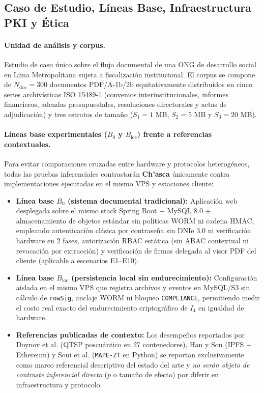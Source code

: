 \documentclass[runningheads,twocolumn]{llncs}
\begin{document}
\subsection{Caso de Estudio, Líneas Base, Infraestructura PKI y Ética}
\paragraph{Unidad de análisis y corpus.} Estudio de caso único sobre el flujo documental de una ONG de desarrollo social en Lima Metropolitana sujeta a fiscalización institucional. El corpus se compone de $N_{\text{doc}} = 300$ documentos PDF/A-1b/2b equitativamente distribuidos en cinco series archivísticas ISO 15489-1 (convenios interinstitucionales, informes financieros, adendas presupuestales, resoluciones directorales y actas de adjudicación) y tres estratos de tamaño ($S_1 = 1$ MB, $S_2 = 5$ MB y $S_3 = 20$ MB).

\paragraph{Líneas base experimentales ($B_0$ y $B_{\text{loc}}$) frente a referencias contextuales.} Para evitar comparaciones cruzadas entre hardware y protocolos heterogéneos, todas las pruebas inferenciales contrastarán \textbf{Ch'asca} únicamente contra implementaciones ejecutadas en el mismo VPS y estaciones cliente:
\begin{itemize}
    \item \textbf{Línea base $B_0$ (sistema documental tradicional):} Aplicación web desplegada sobre el mismo stack Spring Boot + MySQL 8.0 + almacenamiento de objetos estándar sin políticas WORM ni cadena HMAC, empleando autenticación clásica por contraseña sin DNIe 3.0 ni verificación hardware en 2 fases, autorización RBAC estática (sin ABAC contextual ni revocación por extracción) y verificación de firmas delegada al visor PDF del cliente (aplicable a escenarios E1--E10).
    \item \textbf{Línea base $B_{\text{loc}}$ (persistencia local sin endurecimiento):} Configuración aislada en el mismo VPS que registra archivos y eventos en MySQL/S3 sin cálculo de \texttt{rowSig}, anclaje WORM ni bloqueo \texttt{COMPLIANCE}, permitiendo medir el costo real exacto del endurecimiento criptográfico de $I_4$ en igualdad de hardware.
    \item \textbf{Referencias publicadas de contexto:} Los desempeños reportados por Doynov et al. \cite{doynov2026} (QTSP poscuántico en 27 contenedores), Han y Son \cite{han2025} (IPFS + Ethereum) y Soni et al. \cite{soni2026} (\texttt{MAPE-ZT} en Python) se reportan exclusivamente como marco referencial descriptivo del estado del arte y \emph{no serán objeto de contraste inferencial directo} ($p$ o tamaño de efecto) por diferir en infraestructura y protocolo.
\end{itemize}
\end{document}

